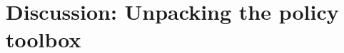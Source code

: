 \documentclass[12pt, a4paper]{article}
\begin{document}

\section{Discussion: Unpacking the policy toolbox} \label{sec:discussion}
\end{document}
